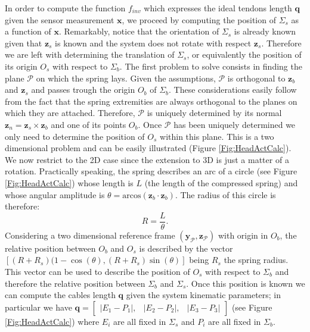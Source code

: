 \documentclass[conference]{IEEEtran}
\numberwithin{equation}{section}
\newcommand{\q}{\mathbf{q}}
\newcommand{\x}{\mathbf{x}}
\begin{document}
In order to compute the function $f_{inv}$ which expresses the ideal tendons length $\q$ given the sensor measurement $\x$, we proceed by computing the position of $\Sigma_s$ as a function of $\x$. Remarkably, notice that the orientation of $\Sigma_s$ is already known given that $\mathbf z_s$ is known and the system does not rotate with respect $\mathbf z_s$. Therefore we are left with determining the translation of $\Sigma_s$, or equivalently the position of its origin $O_s$ with respect to $\Sigma_b$. The first problem to solve consists in finding the plane $\mathcal P$ on which the spring lays. Given  the assumptions, $\mathcal P$ is orthogonal to $\mathbf z_b$ and $\mathbf z_s$ and passes trough the origin $O_b$ of $\Sigma_b$. These considerations easily follow from the fact that the spring extremities are always orthogonal to the planes on which they are attached. Therefore, $\mathcal P$ is uniquely determined by its normal $\mathbf z_n = \mathbf z_s \times \mathbf z_b$ and one of its points $O_b$. Once $\mathcal P$ has been uniquely determined we only need to determine the position of $O_s$ within this plane. This is a two dimensional problem and can be easily illustrated (Figure \ref{Fig:HeadActCalc}). We now restrict to the 2D case since the extension to 3D is just a matter of a rotation. Practically speaking, the spring describes an arc of a circle (see Figure \ref{Fig:HeadActCalc}) whose length is $L$ (the length of the compressed spring) and whose angular amplitude is $\theta = \mbox{arcos}(\mathbf z_b \cdot \mathbf z_b) $. The radius of this circle is therefore:
$$ R = \frac{L}{\theta}.$$
Considering a two dimensional reference frame $(\mathbf y_{\mathcal P}, \mathbf z_{\mathcal P})$ with origin in $O_b$, the relative position between $O_b$ and $O_s$ is described by the vector $[(R+R_s) (1 - \cos(\theta), (R+R_s) \sin(\theta)]$ being $R_s$ the spring radius. This vector can be used to describe the position of $O_s$ with respect to $\Sigma_b$ and therefore the relative position between $\Sigma_b$ and $\Sigma_s$. Once this position is known we can compute the cables length $\q$ given the system kinematic parameters; in particular we have $\q = \begin{bmatrix} |E_1-P_1|, & |E_2-P_2|, & |E_3-P_3| \end{bmatrix} $ (see Figure \ref{Fig:HeadActCalc}) where $E_i$ are all fixed in $\Sigma_s$ and $P_i$ are all fixed in $\Sigma_b$.
\end{document}
